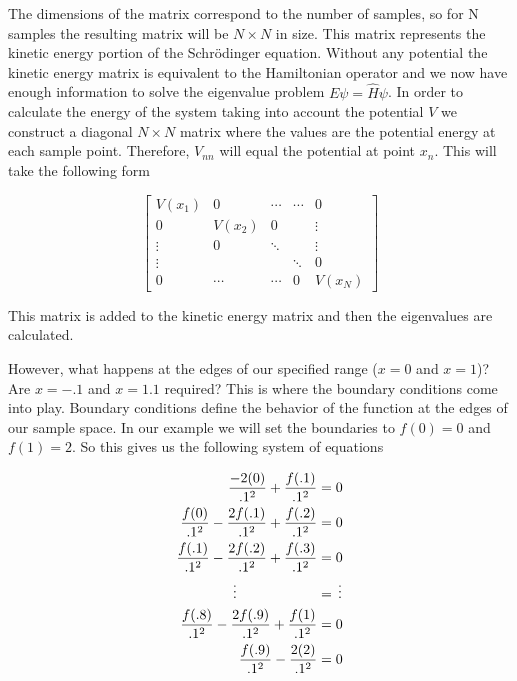 \documentclass[authoryearcitations]{UoYCSproject}
\begin{document}
The dimensions of the matrix correspond to the number of samples, so for N samples the resulting matrix will be
$N \times N$ in size. This matrix represents the kinetic energy portion of the Schr\"{o}dinger equation. Without
any potential the kinetic energy matrix is equivalent to the Hamiltonian operator and we now have enough information
to solve the eigenvalue problem $E\psi = \hat{H}\psi$. In order to calculate the energy of the system taking into 
account the potential $V$ we construct a diagonal $N \times N$ matrix where the values are the potential energy at each sample
point. Therefore, $V_{nn}$ will equal the potential at point $x_{n}$. This will take the following form

\begin{equation}
\begin{bmatrix}
                V(x_1) &   0     &   \cdots & \cdots &     0 \\
                0      &  V(x_2) &    0     &        &  \vdots \\
                \vdots &   0     &   \ddots &        &  \vdots \\
                \vdots &         &          & \ddots &     0 \\
                0      & \cdots  &   \cdots &   0    &   V(x_N)
              \end{bmatrix}
\end{equation}

This matrix is added to the kinetic energy matrix and then the eigenvalues are calculated. 


 
However, what happens at the edges of our specified range ($x = 0$ and $x = 1$)? Are $x = -.1$
and $x = 1.1$ required? This is where the boundary conditions come into play. Boundary conditions define the behavior
of the function at the edges of our sample space. 
In our example we will set the boundaries to $f(0) = 0$ and $f(1) = 2$. So this gives us the following system of equations

\begin{align}
\frac{-2(0)}{.1^2} + \frac{f(.1)}{.1^2} &= 0  \nonumber \\
\frac{f(0)}{.1^2} - \frac{2f(.1)}{.1^2} + \frac{f(.2)}{.1^2} &= 0 \nonumber \\
\frac{f(.1)}{.1^2} - \frac{2f(.2)}{.1^2} + \frac{f(.3)}{.1^2} &= 0\nonumber \\
\vdots \hspace{.8in} &= \, \vdots \nonumber \\
\frac{f(.8)}{.1^2} - \frac{2f(.9)}{.1^2} + \frac{f(1)}{.1^2} &= 0 \nonumber \\
\frac{f(.9)}{.1^2} - \frac{2(2)}{.1^2} &= 0 \nonumber
\end{align}
\end{document}
